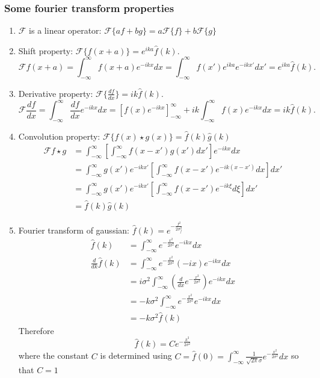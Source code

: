 \documentclass[11pt,a4paper,noindent]{article}
\begin{document}
\subsubsection*{Some fourier transform properties}
\begin{enumerate}
\item $\mathcal{F}$ is a linear operator: $\mathcal{F}\{af + bg\} = a\mathcal{F}\{f\} + b\mathcal{F}\{g\}$
\item Shift property: $\mathcal{F}\{f(x+a)\} = e^{ika} \hat{f}(k).$
\begin{equation}
\mathcal{F}{f(x+a)} = \int_{-\infty}^{\infty} f(x+a) e^{-ikx} dx
 				    = \int_{-\infty}^{\infty} f(x') e^{ika} e^{-ikx'} dx'
 				   = e^{ika} \hat{f}(k).
\end{equation}
\item Derivative property: $\mathcal{F}\{\frac{df}{dx}\} = ik \hat{f}(k).$
\begin{equation}
\mathcal{F}{\frac{df}{dx}} = \int_{-\infty}^{\infty} \frac{df}{dx} e^{-ikx} dx
= \left[f(x)e^{-ikx}\right]^\infty_{-\infty}+ik\int_{-\infty}^{\infty}f(x)e^{-ikx}dx
 				   = ik\hat{f}(k).
\end{equation}
\item Convolution property: $\mathcal{F}\{f(x) \star g(x)\} = \hat{f}(k)\hat{g}(k)$
\begin{align}
\mathcal{F}{f \star g} &= \int_{-\infty}^{\infty} \left [ \int_{-\infty}^{\infty} f(x-x')g(x')dx' \right ] e^{-ikx} dx \\
&= \int_{-\infty}^{\infty} g(x') e^{-ikx'} \left [ \int_{-\infty}^{\infty} f(x-x')e^{-ik(x-x')}dx \right ]  dx' \\
&= \int_{-\infty}^{\infty} g(x') e^{-ikx'} \left [ \int_{-\infty}^{\infty} f(x-x')e^{-ik\xi}d\xi \right ]  dx' \\
&= \hat{f}(k)\hat{g}(k)
\end{align}

\item Fourier transform of gaussian: $\hat{f}(k) = e^{-\frac{f^2}{2\sigma^2_f}}$
\begin{align}
\hat{f}(k) &= \int_{-\infty}^{\infty}  e^{-\frac{x^2}{2\sigma^2}} e^{-ikx} dx \\
\frac{d}{dk} \hat{f}(k) &=  \int_{-\infty}^{\infty}  e^{-\frac{x^2}{2\sigma^2}} (-ix) e^{-ikx} dx \\
&= i\sigma^2 \int_{-\infty}^{\infty}  \left(\frac{d}{dx} e^{-\frac{x^2}{2\sigma^2}}\right)  e^{-ikx} dx \\
&= -k\sigma^2 \int_{-\infty}^{\infty}  e^{-\frac{x^2}{2\sigma^2}} e^{-ikx} dx \\
&= -k\sigma^2 \hat{f}(k)
\end{align}
Therefore
\begin{equation}
\hat{f}(k) = C e^{-\frac{k^2}{2\sigma^2}}
\end{equation}
where the constant $C$ is determined using $C = \hat{f}(0) = \int_{-\infty}^{\infty} \frac{1}{\sqrt{2\pi} \sigma} e^{-\frac{x^2}{2\sigma^2}} dx$ so that $C = 1$
\end{enumerate}
\end{document}
